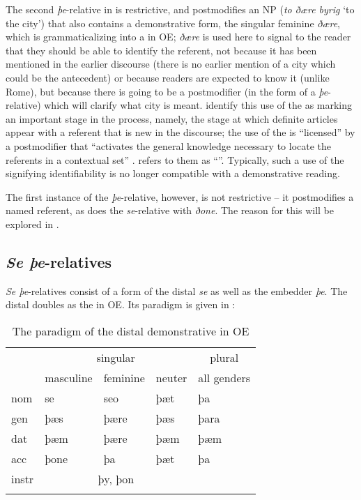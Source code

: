 \documentclass[output=paper,colorlinks,citecolor=brown]{langscibook}
\begin{document}
The second \textit{þe}-relative in  is restrictive, and postmodifies an NP (\textit{to ðære byrig} ‘to the city') that also contains a demonstrative form, the singular feminine \textit{ðære}, which is grammaticalizing into a  in OE; \textit{ðære} is used here to signal to the reader that they should be able to identify the referent, not because it has been mentioned in the earlier discourse (there is no earlier mention of a city which could be the antecedent) or because readers are expected to know it (unlike Rome), but because there is going to be a postmodifier (in the form of a \textit{þe}-relative) which will clarify what city is meant. \citet[172]{ArgüellesLos2022} identify this use of the  as marking an important stage in the  process, namely, the stage at which definite articles appear with a referent that is new in the discourse; the use of the  is “licensed” by a postmodifier that “activates the general knowledge necessary to locate the referents in a contextual set” \citep[74]{Wagener2017}. \citet{Breban2012} refers to them as “”. Typically, such a use of the  signifying identifiability is no longer compatible with a demonstrative reading. 

The first instance of the \textit{þe}{}-relative, however, is not restrictive – it postmodifies a named referent, as does the \textit{se}{}-relative with \textit{ðone}. The reason for this will be explored in .


\subsection{\textit{Se þe}-relatives} \label{sec:los:2.3}
\textit{Se þe}-relatives consist of a form of the distal  \textit{se} as well as the embedder \textit{þe}. The distal  doubles as the  in OE. Its paradigm is given in :

\begin{table}
\begin{tabularx}{\textwidth}{XXXXX} 
\lsptoprule
& \multicolumn{3}{c}{{singular}} & \multicolumn{1}{c}{plural}\\
\cmidrule(lr){2-4}\cmidrule(lr){5-5}
& {masculine} & {feminine} & {neuter} & {all genders}\\
\midrule
{nom} & {se} & {seo} & {þæt} & {þa}\\
{gen} & {þæs} & {þære} & {þæs} & {þara}\\
{dat} & {þæm} & {þære} & {þæm} & {þæm}\\
{acc} & {þone} & {þa} & {þæt} & {þa}\\
{instr} & \multicolumn{3}{c}{{þy, þon}} & \\
\lspbottomrule
\end{tabularx}
\caption{The paradigm of the distal demonstrative in OE}
\label{tab:los:1}
\end{table}
\end{document}
